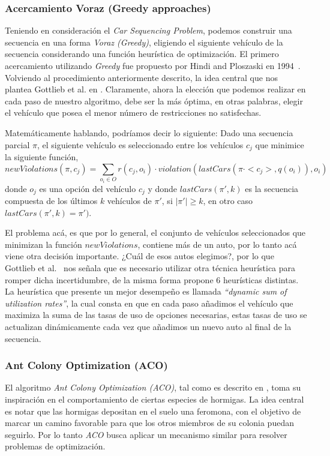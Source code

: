 \subsubsection{Acercamiento Voraz (Greedy approaches)}
Teniendo en consideración el \emph{Car Sequencing Problem}, podemos construir una secuencia
en una forma \emph{Voraz (Greedy)}, eligiendo el siguiente vehículo de la secuencia
considerando una función heurística de optimización.
El primero acercamiento utilizando \emph{Greedy} fue propuesto por
Hindi and Ploszaski en 1994~\cite{HP94}. Volviendo al procedimiento anteriormente descrito, la idea
central que nos plantea Gottlieb et al. en \cite{GPS03}. Claramente, ahora la elección que podemos
realizar en cada paso de nuestro algoritmo, debe ser la más óptima, en otras palabras,
elegir el vehículo que posea el menor número de restricciones no satisfechas.

Matemáticamente hablando, podríamos decir lo siguiente:
Dado una secuencia parcial $\pi$, el siguiente vehículo es seleccionado entre los vehículos $c_j$
que minimice la siguiente función,
$$newViolations(\pi, c_j) = \sum_{o_{i}\in O}r(c_j,o_i)\cdot violation(lastCars(\pi\cdot <c_j>,q(o_i)),o_i)$$
donde $o_j$ es una opción del vehículo $c_j$ y donde $lastCars(\pi',k)$ es la secuencia compuesta de los
últimos $k$ vehículos de $\pi'$, si $|\pi'| \geq k$, en otro caso $lastCars(\pi' , k) = \pi')$.

El problema acá, es que por lo general, el conjunto de vehículos seleccionados que minimizan la función
$newViolations$, contiene más de un auto, por lo tanto acá viene otra decisión importante. ¿Cuál de esos
autos elegimos?, por lo que Gottlieb et al.~\cite{GPS03} nos señala que es necesario utilizar otra técnica heurística para 
romper dicha incertidumbre, de la misma forma propone 6 heurísticas distintas. La heurística que presente
un mejor desempeño es llamada \emph{``dynamic sum of utilization rates''}, la cual consta en que en cada paso
añadimos el vehículo que maximiza la suma de las tasas de uso de opciones necesarias, estas tasas de uso se actualizan
dinámicamente cada vez que añadimos un nuevo auto al final de la secuencia.

\subsubsection{Ant Colony Optimization (ACO)}
El algoritmo \emph{Ant Colony Optimization (ACO)}, tal como es descrito en \cite{DS05},
toma su inspiración en el comportamiento de ciertas especies de hormigas. La idea central
es notar que las hormigas depositan en el suelo una feromona, con el objetivo de marcar
un camino favorable para que los otros miembros de su colonia puedan seguirlo. Por lo tanto
\emph{ACO} busca aplicar un mecanismo similar para resolver problemas de optimización.

